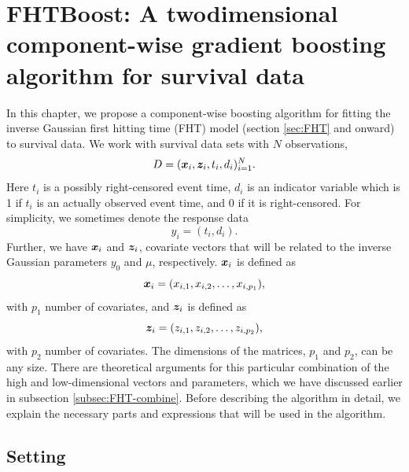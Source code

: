 \chapter{FHTBoost: A twodimensional component-wise gradient boosting algorithm for survival data}
\label{ch:FHTboost}
In this chapter, we propose a component-wise boosting algorithm for fitting the inverse Gaussian first hitting time (FHT) model (section \ref{sec:FHT} and onward) to survival data.
We work with survival data sets with $N$ observations,
\begin{equation}\label{eq:data-fhtboost}
    D=(\bm{x}_i,\bm{z}_i,t_i,d_i)_{i=1}^N.
\end{equation}
Here $t_i$ is a possibly right-censored event time, $d_i$ is an indicator variable which is 1 if $t_i$ is an actually observed event time, and 0 if it is right-censored.
For simplicity, we sometimes denote the response data
\begin{equation*}
    y_i=(t_i,d_i).
\end{equation*}
Further, we have $\bm{x}_i$ and $\bm{z}_i$, covariate vectors that will be related to the inverse Gaussian parameters $y_0$ and $\mu$, respectively.
$\bm{x}_i$ is defined as
\begin{equation}
    \bm{x}_i=(x_{i,1},x_{i,2},\ldots,x_{i,p_1}),
\end{equation}
with $p_1$ number of covariates, and $\bm{z}_i$ is defined as
\begin{equation}
    \bm{z}_i=(z_{i,1},z_{i,2},\ldots,z_{i,p_2}),
\end{equation}
with $p_2$ number of covariates.
The dimensions of the matrices, $p_1$ and $p_2$, can be any size.
There are theoretical arguments for this particular combination of the high and low-dimensional vectors and parameters, which we have discussed earlier in subsection \ref{subsec:FHT-combine}.
Before describing the algorithm in detail, we explain the necessary parts and expressions that will be used in the algorithm.

\section{Setting}
